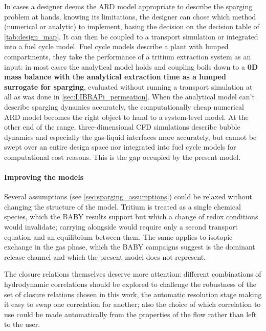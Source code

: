 \documentclass[a4paper,11pt,oneside]{report}
\newcounter{assumption}[chapter]
\begin{document}
In cases a designer deems the ARD model appropriate to describe the sparging problem at hands, knowing its limitations, the designer can chose which method (numerical or analytic) to implement, basing the decision on the decision table of \cref{tab:design_map}. It can then be coupled to a transport simulation or integrated into a fuel cycle model. Fuel cycle models describe a plant with lumped compartments, they take the performance of a tritium extraction system as an input: in most cases the analytical model holds and coupling boils down to a \textbf{0D mass balance with the analytical extraction time as a lumped surrogate for sparging}, evaluated without running a transport simulation at all as was done in \cref{sec:LIBRAPi_permeation}. When the analytical model can't describe sparging dynamics accurately, the computationally cheap numerical ARD model becomes the right object to hand to a system-level model. At the other end of the range, three-dimensional CFD simulations describe bubble dynamics and especially the gas-liquid interfaces more accurately, but cannot be swept over an entire design space nor integrated into fuel cycle models for computational cost reasons. This is the gap occupied by the present model.



\paragraph{Improving the models}


Several assumptions (see \cref{sec:sparging_assumptions}) could be relaxed without changing the structure of the model. Tritium is treated as a single chemical species, which the BABY results support but which a change of redox conditions would invalidate; carrying  alongside  would require only a second transport equation and an equilibrium between them. The same applies to isotopic exchange in the gas phase, which the BABY campaigns suggest is the dominant release channel and which the present model does not represent. 

The closure relations themselves deserve more attention: different combinations of hydrodynamic correlations should be explored to challenge the robustness of the set of closure relations chosen in this work, the automatic resolution stage making it easy to swap one correlation for another; also the choice of which correlation to use could be made automatically from the properties of the flow rather than left to the user.
\end{document}
